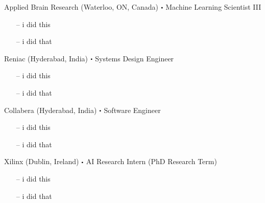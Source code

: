 	    {
	    	Applied Brain Research (Waterloo, ON, Canada)}
	    {
	    	$\sbullet$ Machine Learning Scientist III
	    }
	    {
	        \begin{itemize}
	            \item [--] i did this
	            \item [--] i did that
	        \end{itemize}
	    }
	    {
		    Reniac (Hyderabad, India)}
	    {
		    $\sbullet$ Systems Design Engineer
	    }
	    {
	        \begin{itemize}
	            \item [--] i did this
	            \item [--] i did that
	        \end{itemize}
	    }
	    {
		    Collabera (Hyderabad, India)}
	    {
		    $\sbullet$ Software Engineer
	    }
	    {
	        \begin{itemize}
	            \item [--] i did this
	            \item [--] i did that
	        \end{itemize}
	    }


	    {
		    Xilinx (Dublin, Ireland)}
	    {
		    $\sbullet$ AI Research Intern (PhD Research Term)
	    }
	    {
	        \begin{itemize}
	            \item [--]  i did this
	            \item [--]  i did that
	        \end{itemize}
	    }